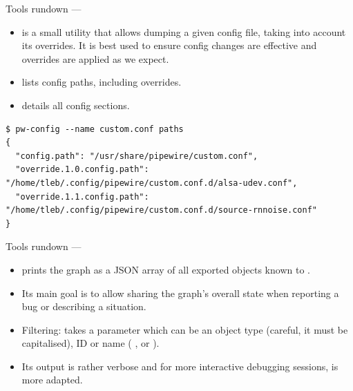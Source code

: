 \begin{frame}[fragile]{Tools rundown — }
  \begin{itemize}

  \item {} is a small utility that allows dumping a given
    config file, taking into account its overrides. It is best used to
    ensure config changes are effective and overrides are applied as we
    expect.

  \item {} lists config paths, including overrides.

  \item {} details all config sections.

  \end{itemize}

    \begin{block}{}
      \fontsize{7}{7}\selectfont
        \begin{verbatim}
$ pw-config --name custom.conf paths
{
  "config.path": "/usr/share/pipewire/custom.conf",
  "override.1.0.config.path": "/home/tleb/.config/pipewire/custom.conf.d/alsa-udev.conf",
  "override.1.1.config.path": "/home/tleb/.config/pipewire/custom.conf.d/source-rnnoise.conf"
}
        \end{verbatim}
      \end{block}
\end{frame}



\begin{frame}{Tools rundown — }
  \begin{itemize}

  \item {} prints the graph as a JSON array of all exported
    objects known to .

  \item Its main goal is to allow sharing the graph’s overall state
    when reporting a bug or describing a situation.

  \item Filtering:  takes a parameter which can be an
    object type (careful, it must be capitalised), ID or name (
    ,  or ).

  \item Its output is rather verbose and for more interactive debugging
    sessions,  is more adapted.

  \end{itemize}
\end{frame}



